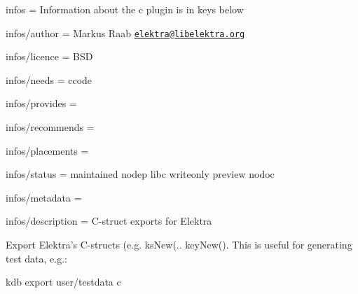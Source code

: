 
\begin{DoxyItemize}
\item infos = Information about the c plugin is in keys below
\item infos/author = Markus Raab \href{mailto:elektra@libelektra.org}{\tt elektra@libelektra.\+org}
\item infos/licence = B\+SD
\item infos/needs = ccode
\item infos/provides =
\item infos/recommends =
\item infos/placements =
\item infos/status = maintained nodep libc writeonly preview nodoc
\item infos/metadata =
\item infos/description = C-\/struct exports for Elektra
\end{DoxyItemize}

Export Elektra’s C-\/structs (e.\+g. {\ttfamily ks\+New(.. key\+New(}). This is useful for generating test data, e.\+g.\+: \begin{DoxyVerb}    kdb export user/testdata c\end{DoxyVerb}
 